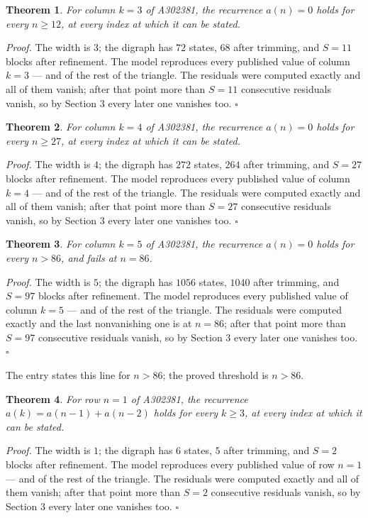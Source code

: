 \documentclass[11pt]{article}
\newtheorem{theorem}{Theorem}
\theoremstyle{definition}
\begin{document}
\begin{theorem} For column $k = 3$ of A302381, the recurrence $a(n) = 0$ holds for every $n \ge 12$, at every index at which it can be stated.\end{theorem}

{\itshape Proof.} The width is $3$; the digraph has $72$ states, $68$ after trimming, and $S = 11$ blocks after refinement. The model reproduces every published value of column $k = 3$ --- and of the rest of the triangle. The residuals were computed exactly and all of them vanish; after that point more than $S = 11$ consecutive residuals vanish, so by Section 3 every later one vanishes too. $\square$

\begin{theorem} For column $k = 4$ of A302381, the recurrence $a(n) = 0$ holds for every $n \ge 27$, at every index at which it can be stated.\end{theorem}

{\itshape Proof.} The width is $4$; the digraph has $272$ states, $264$ after trimming, and $S = 27$ blocks after refinement. The model reproduces every published value of column $k = 4$ --- and of the rest of the triangle. The residuals were computed exactly and all of them vanish; after that point more than $S = 27$ consecutive residuals vanish, so by Section 3 every later one vanishes too. $\square$

\begin{theorem} For column $k = 5$ of A302381, the recurrence $a(n) = 0$ holds for every $n > 86$, and fails at $n = 86$.\end{theorem}

{\itshape Proof.} The width is $5$; the digraph has $1056$ states, $1040$ after trimming, and $S = 97$ blocks after refinement. The model reproduces every published value of column $k = 5$ --- and of the rest of the triangle. The residuals were computed exactly and the last nonvanishing one is at $n = 86$; after that point more than $S = 97$ consecutive residuals vanish, so by Section 3 every later one vanishes too. $\square$

The entry states this line for $n > 86$; the proved threshold is $n > 86$.

\begin{theorem} For row $n = 1$ of A302381, the recurrence $a(k) = a(n-1) + a(n-2)$ holds for every $k \ge 3$, at every index at which it can be stated.\end{theorem}

{\itshape Proof.} The width is $1$; the digraph has $6$ states, $5$ after trimming, and $S = 2$ blocks after refinement. The model reproduces every published value of row $n = 1$ --- and of the rest of the triangle. The residuals were computed exactly and all of them vanish; after that point more than $S = 2$ consecutive residuals vanish, so by Section 3 every later one vanishes too. $\square$
\end{document}
